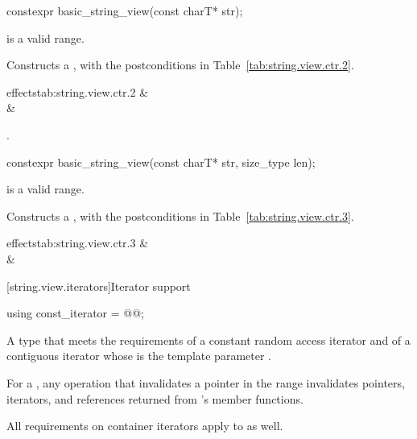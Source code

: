 %
\begin{itemdecl}
constexpr basic_string_view(const charT* str);
\end{itemdecl}

\begin{itemdescr}
\pnum
\requires
{} is a valid range.

\pnum
\effects
Constructs a , with the postconditions
in Table~\ref{tab:string.view.ctr.2}.
\begin{libefftabvaluenarrow}{ effects}{tab:string.view.ctr.2}
 &  \\
 &  \\
\end{libefftabvaluenarrow}

\pnum
\complexity
{}.
\end{itemdescr}

%
\begin{itemdecl}
constexpr basic_string_view(const charT* str, size_type len);
\end{itemdecl}

\begin{itemdescr}
\pnum
\requires
{} is a valid range.

\pnum
\effects
Constructs a , with the postconditions in Table~\ref{tab:string.view.ctr.3}.
\begin{libefftabvaluenarrow}{ effects}{tab:string.view.ctr.3}
 &  \\
 &  \\
\end{libefftabvaluenarrow}
\end{itemdescr}

[string.view.iterators]{Iterator support}

%
\begin{itemdecl}
using const_iterator = @@;
\end{itemdecl}

\begin{itemdescr}
\pnum
A type that meets the requirements
of a constant random access iterator and
of a contiguous iterator
whose  is the template parameter .

\pnum
For a , any operation that invalidates a pointer in the range  invalidates pointers, iterators, and references returned from 's member functions.

\pnum
All requirements on container iterators apply to  as well.
\end{itemdescr}

